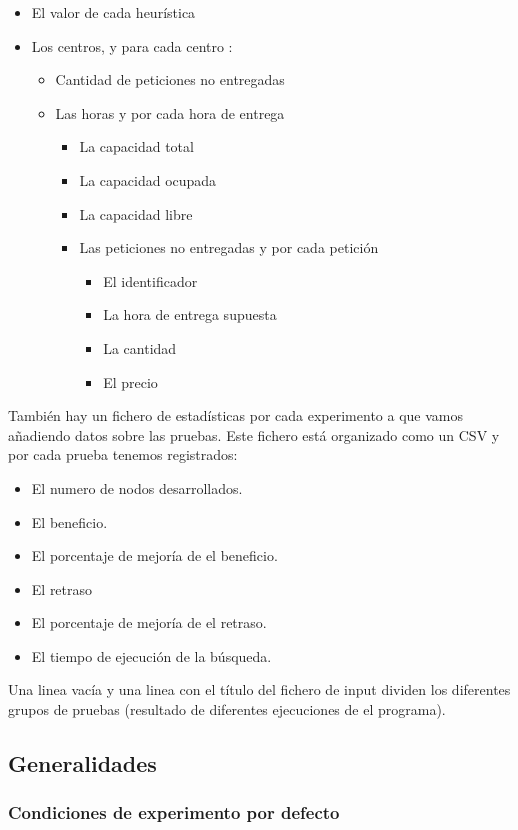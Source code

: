 \documentclass{article}
\begin{document}
\begin{itemize}
\item El valor de cada heurística
\item Los centros, y para cada centro :
	\begin{itemize}
		\item Cantidad de peticiones no entregadas
		\item Las horas y por cada hora de entrega
		\begin{itemize}		
			\item La capacidad total
			\item La capacidad ocupada
			\item La capacidad libre
			\item Las peticiones no entregadas y por cada petición		
			\begin{itemize}
			\item El identificador
			\item La hora de entrega supuesta
			\item La cantidad
			\item El precio
			\end{itemize}
		\end{itemize}
	\end{itemize}
\end{itemize}
También hay un fichero de estadísticas por cada experimento a que vamos
añadiendo datos sobre las pruebas. Este fichero está organizado como un CSV y
por cada prueba tenemos registrados:
\begin{itemize}
\item El numero de nodos desarrollados. 
\item El beneficio.
\item El porcentaje de mejoría de el beneficio.
\item El retraso
\item El porcentaje de mejoría de el retraso.
\item El tiempo de ejecución de la búsqueda.
\end{itemize}
Una linea vacía y una linea con el título del fichero de input dividen los diferentes grupos de pruebas (resultado de diferentes ejecuciones de el programa).

\subsection{Generalidades}

\subsubsection{Condiciones de experimento por defecto}
\end{document}
